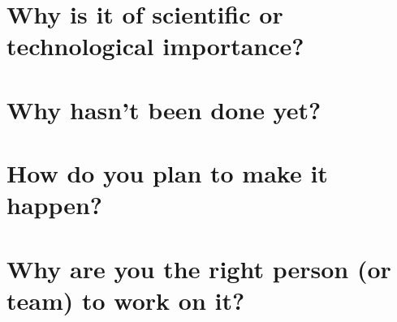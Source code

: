 \documentclass{article}[11pt]
\begin{document}
\section{Why is it of scientific or technological importance?}



\section{Why hasn't been done yet?}


\section{How do you plan to make it happen?}


\section{Why are you the right person (or
team) to work on it?}

\end{document}
